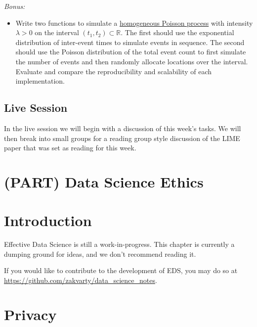 \documentclass[
  12pt,
]{book}
\providecommand{\tightlist}{%
  \setlength{\itemsep}{0pt}\setlength{\parskip}{0pt}}
\begin{document}
\emph{Bonus:}

\begin{itemize}
\tightlist
\item
  Write two functions to simulate a \href{https://en.wikipedia.org/wiki/Poisson_point_process\#Homogeneous_case_2}{homogeneous Poisson process} with intensity \(\lambda >0\) on the interval \((t_1, t_2) \subset \mathbb{R}\). The first should use the exponential distribution of inter-event times to simulate events in sequence. The second should use the Poisson distribution of the total event count to first simulate the number of events and then randomly allocate locations over the interval. Evaluate and compare the reproducibility and scalability of each implementation.
\end{itemize}

\hypertarget{live-session-3}{%
\section{Live Session}\label{live-session-3}}

In the live session we will begin with a discussion of this week's tasks. We will then break into small groups for a reading group style discussion of the LIME paper that was set as reading for this week.

\hypertarget{part-data-science-ethics}{%
\chapter{(PART) Data Science Ethics}\label{part-data-science-ethics}}

\hypertarget{ethics-introduction}{%
\chapter*{Introduction}\label{ethics-introduction}}

Effective Data Science is still a work-in-progress. This chapter is currently a dumping ground for ideas, and we don't recommend reading it.

If you would like to contribute to the development of EDS, you may do so at \url{https://github.com/zakvarty/data_science_notes}.

\hypertarget{ethics-privacy}{%
\chapter{Privacy}\label{ethics-privacy}}
\end{document}
